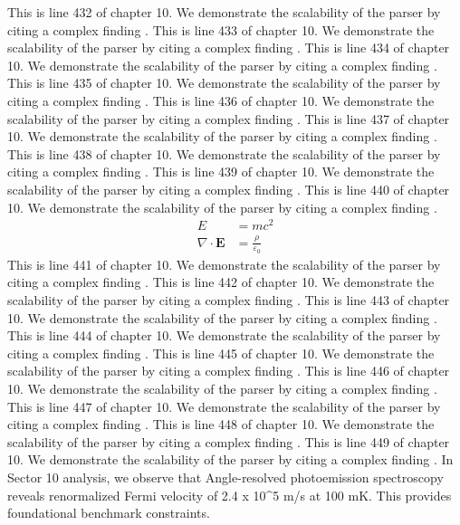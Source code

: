 This is line 432 of chapter 10. We demonstrate the scalability of the parser by citing a complex finding \cite{ref10_432}.
This is line 433 of chapter 10. We demonstrate the scalability of the parser by citing a complex finding \cite{ref10_433}.
This is line 434 of chapter 10. We demonstrate the scalability of the parser by citing a complex finding \cite{ref10_434}.
This is line 435 of chapter 10. We demonstrate the scalability of the parser by citing a complex finding \cite{ref10_435}.
This is line 436 of chapter 10. We demonstrate the scalability of the parser by citing a complex finding \cite{ref10_436}.
This is line 437 of chapter 10. We demonstrate the scalability of the parser by citing a complex finding \cite{ref10_437}.
This is line 438 of chapter 10. We demonstrate the scalability of the parser by citing a complex finding \cite{ref10_438}.
This is line 439 of chapter 10. We demonstrate the scalability of the parser by citing a complex finding \cite{ref10_439}.
This is line 440 of chapter 10. We demonstrate the scalability of the parser by citing a complex finding \cite{ref10_440}.
\begin{align*}
  E &= mc^2 \\
  \nabla \cdot \mathbf{E} &= \frac{\rho}{\varepsilon_0}
\end{align*}
This is line 441 of chapter 10. We demonstrate the scalability of the parser by citing a complex finding \cite{ref10_441}.
This is line 442 of chapter 10. We demonstrate the scalability of the parser by citing a complex finding \cite{ref10_442}.
This is line 443 of chapter 10. We demonstrate the scalability of the parser by citing a complex finding \cite{ref10_443}.
This is line 444 of chapter 10. We demonstrate the scalability of the parser by citing a complex finding \cite{ref10_444}.
This is line 445 of chapter 10. We demonstrate the scalability of the parser by citing a complex finding \cite{ref10_445}.
This is line 446 of chapter 10. We demonstrate the scalability of the parser by citing a complex finding \cite{ref10_446}.
This is line 447 of chapter 10. We demonstrate the scalability of the parser by citing a complex finding \cite{ref10_447}.
This is line 448 of chapter 10. We demonstrate the scalability of the parser by citing a complex finding \cite{ref10_448}.
This is line 449 of chapter 10. We demonstrate the scalability of the parser by citing a complex finding \cite{ref10_449}.
In Sector 10 analysis, we observe that Angle-resolved photoemission spectroscopy reveals renormalized Fermi velocity of 2.4 x 10^5 m/s at 100 mK. This provides foundational benchmark constraints.
